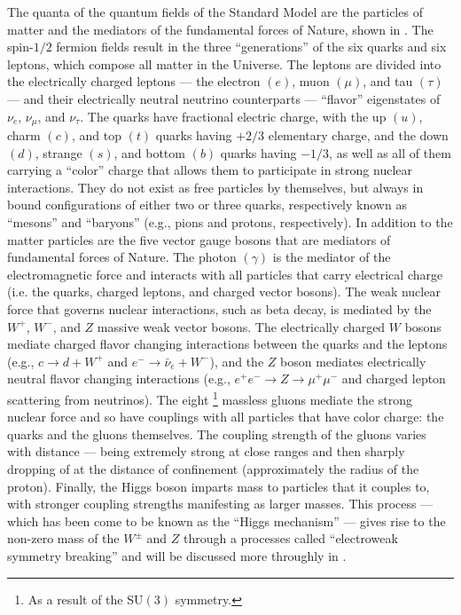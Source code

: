 The quanta of the quantum fields of the Standard Model are the particles of matter and the mediators of the fundamental forces of Nature, shown in .
The spin-$1/2$ fermion fields result in the three ``generations'' of the six quarks and six leptons, which compose all matter in the Universe.
The leptons are divided into the electrically charged leptons --- the electron $(e)$, muon $(\mu)$, and tau $(\tau)$ --- and their electrically neutral neutrino counterparts --- ``flavor'' eigenstates of $\nu_{e}$, $\nu_{\mu}$, and $\nu_{\tau}$.
The quarks have fractional electric charge, with the up $(u)$, charm $(c)$, and top $(t)$ quarks having $+2/3$ elementary charge, and the down $(d)$, strange $(s)$, and bottom $(b)$ quarks having $-1/3$, as well as all of them carrying a ``color'' charge that allows them to participate in strong nuclear interactions.
They do not exist as free particles by themselves, but always in bound configurations of either two or three quarks, respectively known as ``mesons'' and ``baryons'' (e.g., pions and protons, respectively).
In addition to the matter particles are the five vector gauge bosons that are mediators of fundamental forces of Nature.
The photon $(\gamma)$ is the mediator of the electromagnetic force and interacts with all particles that carry electrical charge (i.e. the quarks, charged leptons, and charged vector bosons).
The weak nuclear force that governs nuclear interactions, such as beta decay, is mediated by the $W^{+}$, $W^{-}$, and $Z$ massive weak vector bosons.
The electrically charged $W$ bosons mediate charged flavor changing interactions between the quarks and the leptons (e.g., $c \to d + W^{+}$ and $e^{-} \to \bar{\nu}_{e} + W^{-}$), and the $Z$ boson mediates electrically neutral flavor changing interactions (e.g., $e^{+}e^{-} \to Z \to \mu^{+}\mu^{-}$ and charged lepton scattering from neutrinos).
The eight%
\footnote{As a result of the $\mathrm{SU}(3)$ symmetry.}
massless gluons mediate the strong nuclear force and so have couplings with all particles that have color charge: the quarks and the gluons themselves.
The coupling strength of the gluons varies with distance --- being extremely strong at close ranges and then sharply dropping of at the distance of confinement (approximately the radius of the proton).
Finally, the Higgs boson imparts mass to particles that it couples to, with stronger coupling strengths manifesting as larger masses.
This process --- which has been come to be known as the ``Higgs mechanism'' --- gives rise to the non-zero mass of the $W^{\pm}$ and $Z$ through a processes called ``electroweak symmetry breaking'' and will be discussed more throughly in .

